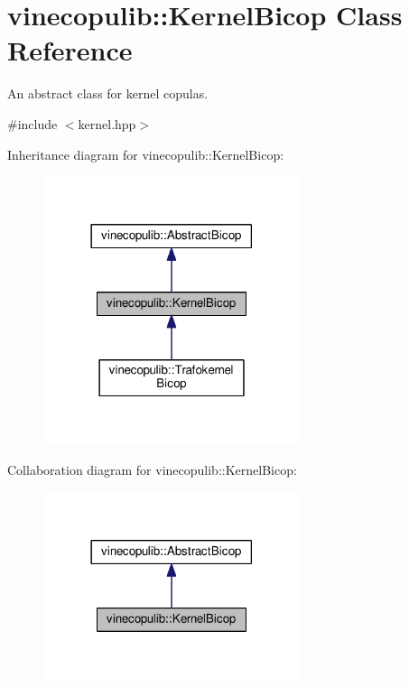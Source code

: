 \hypertarget{classvinecopulib_1_1_kernel_bicop}{}\section{vinecopulib\+:\+:Kernel\+Bicop Class Reference}
\label{classvinecopulib_1_1_kernel_bicop}


An abstract class for kernel copulas.  




{\ttfamily \#include $<$kernel.\+hpp$>$}



Inheritance diagram for vinecopulib\+:\+:Kernel\+Bicop\+:\nopagebreak
\begin{figure}[H]
\begin{center}
\leavevmode
\includegraphics[width=213pt]{classvinecopulib_1_1_kernel_bicop__inherit__graph}
\end{center}
\end{figure}


Collaboration diagram for vinecopulib\+:\+:Kernel\+Bicop\+:\nopagebreak
\begin{figure}[H]
\begin{center}
\leavevmode
\includegraphics[width=213pt]{classvinecopulib_1_1_kernel_bicop__coll__graph}
\end{center}
\end{figure}

